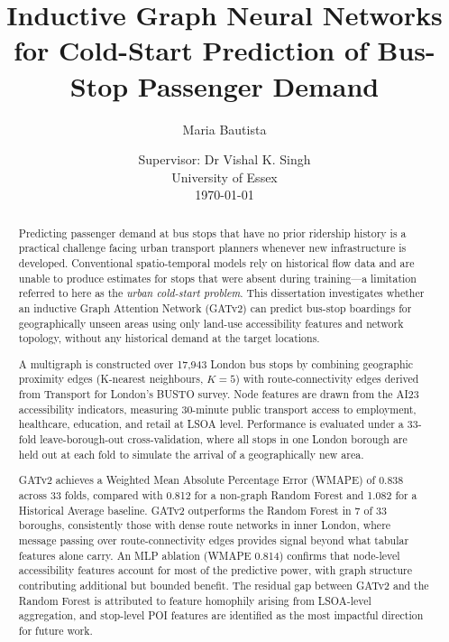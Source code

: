 \documentclass[12pt,a4paper]{report}
\title{\textbf{Inductive Graph Neural Networks for Cold-Start Prediction of Bus-Stop Passenger Demand}}
\author{Maria Bautista}
\date{Supervisor: Dr Vishal K. Singh \\ University of Essex \\ \today}
\begin{document}
\maketitle

\begin{abstract}
\noindent
Predicting passenger demand at bus stops that have no prior ridership history
is a practical challenge facing urban transport planners whenever new
infrastructure is developed. Conventional spatio-temporal models rely on
historical flow data and are unable to produce estimates for stops that were
absent during training---a limitation referred to here as the
\emph{urban cold-start problem}. This dissertation investigates whether an
inductive Graph Attention Network (GATv2) can predict bus-stop boardings for
geographically unseen areas using only land-use accessibility features and
network topology, without any historical demand at the target locations.

A multigraph is constructed over 17,943 London bus stops by combining
geographic proximity edges (K-nearest neighbours, $K{=}5$) with route-connectivity
edges derived from Transport for London's BUSTO survey. Node features are drawn
from the AI23 accessibility indicators, measuring 30-minute public transport
access to employment, healthcare, education, and retail at LSOA level.
Performance is evaluated under a 33-fold leave-borough-out cross-validation,
where all stops in one London borough are held out at each fold to simulate
the arrival of a geographically new area.

GATv2 achieves a Weighted Mean Absolute Percentage Error (WMAPE) of 0.838 across
33 folds, compared with 0.812 for a non-graph Random Forest and 1.082 for a
Historical Average baseline. GATv2 outperforms the Random Forest in 7 of 33
boroughs, consistently those with dense route networks in inner London, where
message passing over route-connectivity edges provides signal beyond what
tabular features alone carry. An MLP ablation (WMAPE 0.814) confirms that
node-level accessibility features account for most of the predictive power, with
graph structure contributing additional but bounded benefit. The residual gap
between GATv2 and the Random Forest is attributed to feature homophily arising
from LSOA-level aggregation, and stop-level POI features are identified as the
most impactful direction for future work.
\end{abstract}

\tableofcontents
\listoffigures
\listoftables
\end{document}
